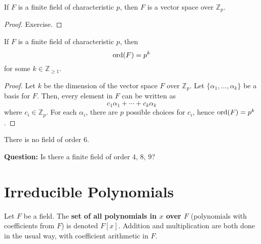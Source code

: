 \begin{thmbox}
    \begin{theorem}
        If $ F $ is a finite field of characteristic $ p $, then $ F $
        is a vector space over $ \mathbb{Z}_p $.
    \end{theorem}
\end{thmbox}

\begin{proof}
    Exercise.
\end{proof}

\begin{thmbox}
    \begin{theorem}
        If $ F $ is a finite field of characteristic $ p $, then
        \[ \operatorname{ord}(F)=p^k \]
        for some $ k\in\mathbb{Z}_{\geqslant 1} $.
    \end{theorem}
\end{thmbox}

\begin{proof}
    Let $ k $ be the dimension of the vector space $ F $ over $ \mathbb{Z}_p $.
    Let $ \{\alpha_1,\ldots ,\alpha_k\} $ be a basis for $ F $. Then, every element
    in $ F $ can be written as
    \[ c_1\alpha_1+\cdots+c_k\alpha_k \]
    where $ c_i\in\mathbb{Z}_p $. For each $ \alpha_i $, there are $ p $
    possible choices for $ c_i $, hence $ \operatorname{ord}(F)=p^k $.
\end{proof}

\begin{exbox}
    \begin{example}
    There is no field of order $ 6 $.
    \end{example}
\end{exbox}

\textbf{Question:} Is there a finite field of order $ 4,\,8,\,9 $?

\section{Irreducible Polynomials}

\begin{defbox}
    \begin{definition}
        Let $ F $ be a field. The \textbf{set of all polynomials in $ x $ over $ F $}
        (polynomials with coefficients from $ F $) is denoted $ F[x] $. Addition
        and multiplication are both done in the usual way, with coefficient arithmetic
        in $ F $.
    \end{definition}
\end{defbox}

